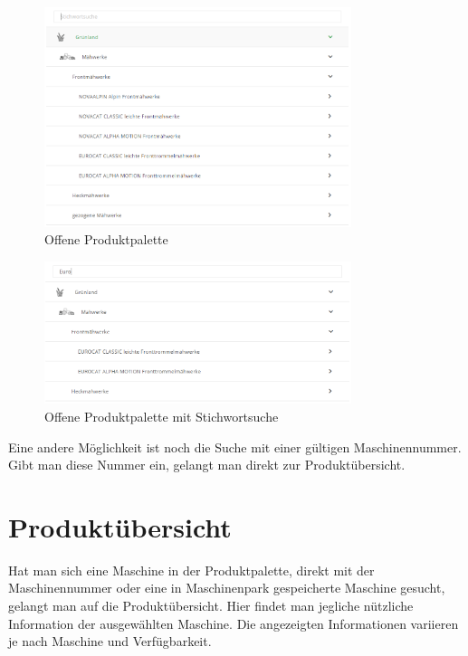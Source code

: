 \begin{figure}[H]
	\centerline{
		\includegraphics[width=0.8\textwidth]{./grafiken/erm_produktpalette_offen.png}
	}
	\vskip0pt
	\caption{Offene Produktpalette} \label{fig:produktpaletteOffen}
\end{figure}

\begin{figure}[H]
	\centerline{
		\includegraphics[width=0.8\textwidth]{./grafiken/erm_produktpalette_offen_stichwort.PNG}
	}
	\vskip0pt
	\caption{Offene Produktpalette mit Stichwortsuche} \label{fig:produktpaletteMitStichwort}
\end{figure}

Eine andere Möglichkeit ist noch die Suche mit einer gültigen Maschinennummer. Gibt man diese Nummer ein, gelangt man direkt zur Produktübersicht.

\section{Produktübersicht}

Hat man sich eine Maschine in der Produktpalette, direkt mit der Maschinennummer oder eine in Maschinenpark gespeicherte Maschine gesucht, gelangt man auf die Produktübersicht. Hier findet man jegliche nützliche Information der ausgewählten Maschine. Die angezeigten Informationen variieren je nach Maschine und Verfügbarkeit.

